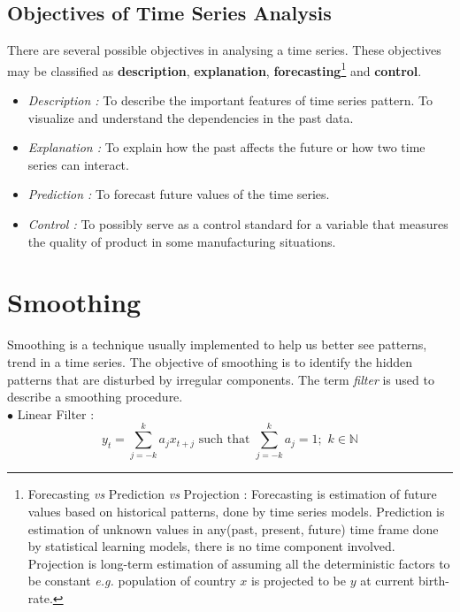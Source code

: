 \documentclass[11pt, a4paper]{article}
\numberwithin{equation}{section}
\theoremstyle{definition}
\begin{document}
\newpage

\subsection{Objectives of Time Series Analysis}

There are several possible objectives in analysing a time series. These objectives may be classified as \textbf{description}, \textbf{explanation}, \textbf{forecasting}\footnote{Forecasting \textit{vs} Prediction \textit{vs} Projection : Forecasting is estimation of future values based on historical patterns, done by time series models. Prediction is estimation of unknown values in any(past, present, future) time frame done by statistical learning models, there is no time component involved.  Projection is long-term estimation of assuming all the deterministic factors to be constant \textit{e.g.} population of country $x$ is projected to be $y$ at current birth-rate.} and \textbf{control}.
 
\begin{itemize}
\item \textit{Description : } To describe the important features of time series pattern. To visualize and understand the dependencies in the past data.
\item \textit{Explanation : } To explain how the past affects the future or how two time series can interact.
\item \textit{Prediction : } To forecast future values of the time series.
\item \textit{Control : } To possibly serve as a control standard for a variable that measures the quality of product in some manufacturing situations.
\end{itemize}

\newpage
\section{Smoothing}

Smoothing is a technique usually implemented to help us better see patterns, trend in a time series. The objective of smoothing is to identify the hidden patterns that are disturbed by irregular components. The term \textit{filter} is used to describe a smoothing procedure. \\[0.2em]

$\bullet$ Linear Filter : 
\begin{equation}\label{linearfilter}
y_t = \sum \limits_{j = -k}^{k} a_j x_{t+j} \text{ such that } \sum \limits_{j = -k}^{k} a_j = 1; \,\, k \in \mathbb{N}
\end{equation}
\end{document}
